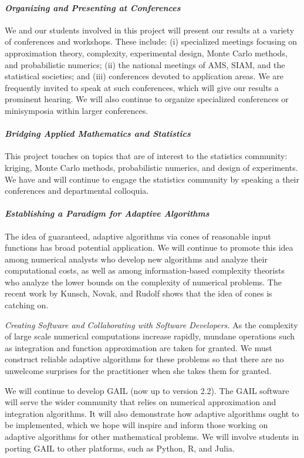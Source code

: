 \documentclass[11pt]{NSFamsart}
\newcommand{\GAIL}{GAIL\xspace}
\newcommand{\Rlang}{R\xspace}
\newcommand{\Julia}{Julia\xspace}
\newcommand{\fredparagraph}[1]{\paragraph*{\emph{#1}}}
\begin{document}
\fredparagraph{Organizing and Presenting at Conferences}
We and our students involved in this project will present our results at a variety of conferences and workshops.  These include: (i) specialized meetings focusing on approximation theory, complexity, 
experimental design, Monte Carlo methods, and probabilistic numerics; (ii) the national meetings of AMS, SIAM, and the 
statistical societies; and (iii) conferences devoted to application areas.  We are frequently invited to 
speak at such conferences, which will give our results a prominent hearing. We will also continue to 
organize specialized conferences or minisymposia within larger conferences.

\fredparagraph{Bridging Applied Mathematics and Statistics}
This project touches on topics that are of interest to the statistics community: kriging, Monte Carlo methods, probabilistic numerics, and design of experiments.  We have and will continue to engage the statistics community 
by speaking a their conferences and departmental colloquia.

\fredparagraph{Establishing a Paradigm for Adaptive Algorithms} The idea of guaranteed, adaptive algorithms via cones of reasonable input 
functions has broad potential application.  We will continue to promote this idea among numerical analysts 
who 
develop new algorithms and analyze their computational costs, as well as among information-based 
complexity theorists who analyze the lower bounds on the complexity of numerical problems.  The recent work by Kunsch, Novak, and Rudolf \cite{KunEtal19a} shows that the idea of cones is catching on.


\emph{Creating Software and Collaborating with Software Developers.}
As the complexity of large scale numerical computations increase rapidly, mundane operations such as integration and function approximation are taken for granted. We must construct reliable adaptive algorithms for these problems so that there are no unwelcome surprises for the practitioner when she takes them for granted.

We will continue to develop \GAIL \citep{ChoEtal17b} (now up to version 2.2).  The \GAIL software 
will serve the wider community that relies on numerical approximation and integration algorithms.  It will 
also demonstrate how adaptive algorithms ought to be implemented, which we hope will inspire and 
inform those working on adaptive algorithms for other mathematical problems.  We will involve 
students in porting \GAIL to other platforms, such as Python, \Rlang, and \Julia.  
\end{document}
